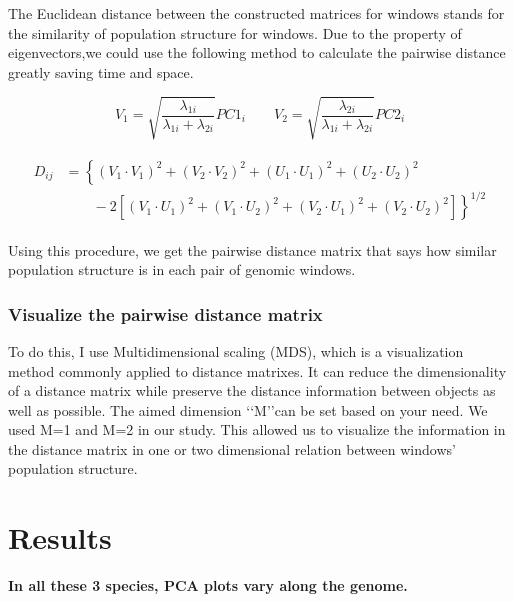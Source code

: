 \documentclass[11pt, oneside]{article}   	%
\begin{document}
The Euclidean distance between the constructed matrices for windows stands for the
similarity of population structure for windows. Due to the property of eigenvectors,we
could use the following method to calculate the pairwise distance greatly saving time and space.

\begin{equation}
V_{1}=\sqrt{\frac{\lambda _{1i}}{\lambda _{1i}+\lambda _{2i}}}PC1_{i} \qquad
V_{2}=\sqrt{\frac{\lambda _{2i}}{\lambda _{1i}+\lambda _{2i}}}PC2_{i}
\end{equation}

\begin{align}
    \begin{split}
    D_{ij} &= 
        \left \{
                \left ( 
                    V_{1}\cdot V_{1}^{} 
                \right )^{2}
                + \left ( V_{2}\cdot V_{2}^{} \right )^{2}
                + \left ( U_{1}\cdot U_{1}^{} \right )^{2} 
                +\left ( U_{2}\cdot U_{2}^{} \right )^{2} 
        \right. \\ 
        & \left. \qquad {}  
            -2\left [ 
                \left ( V_{1}\cdot U_{1}^{} \right )^{2}
                + \left ( V_{1}\cdot U_{2}^{} \right )^{2}
                + \left ( V_{2}\cdot U_{1}^{} \right )^{2} 
                + \left ( V_{2}\cdot U_{2}^{} \right )^{2}
            \right ]
        \right \}^{1/2}
    \end{split}
\end{align}

Using this procedure, 
we get the pairwise distance matrix that says how similar population structure is 
in each pair of genomic windows.
\subsubsection{Visualize the pairwise distance matrix}
To do this, I use Multidimensional scaling (MDS), 
which is a visualization method commonly applied to distance matrixes. 
It can reduce the dimensionality of a distance matrix while preserve the distance information between objects as well as possible. The aimed dimension \lq\lq M\rq\rq can be set based on your need. We used M=1 and M=2 in our study. This allowed us to visualize the information in the distance matrix in one or two dimensional relation between windows' population structure.

\section{Results}
\textbf{In all these 3 species, PCA plots vary along the genome.}
\end{document}

